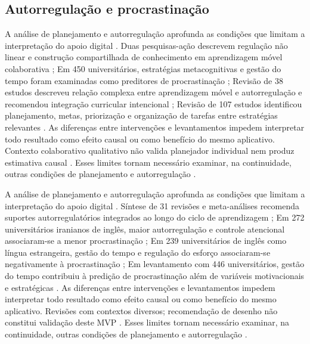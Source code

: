 \clearpage\subsection*{Autorregulação e procrastinação}

A análise de planejamento e autorregulação aprofunda as condições que limitam a interpretação do apoio digital \citep{education_lim2019} \citep{education_limone2020} \citep[p. 156, 164–165]{education_palalas2020} \citep{education_patzak2025}. Duas pesquisas-ação descrevem regulação não linear e construção compartilhada de conhecimento em aprendizagem móvel colaborativa \citep{education_lim2019}; Em 450 universitários, estratégias metacognitivas e gestão do tempo foram examinadas como preditores de procrastinação \citep{education_limone2020}; Revisão de 38 estudos descreveu relação complexa entre aprendizagem móvel e autorregulação e recomendou integração curricular intencional \citep[p. 156, 164–165]{education_palalas2020}; Revisão de 107 estudos identificou planejamento, metas, priorização e organização de tarefas entre estratégias relevantes \citep{education_patzak2025}. As diferenças entre intervenções e levantamentos impedem interpretar todo resultado como efeito causal ou como benefício do mesmo aplicativo. Contexto colaborativo qualitativo não valida planejador individual nem produz estimativa causal \citep{education_lim2019} \citep{education_limone2020} \citep[p. 156, 164–165]{education_palalas2020} \citep{education_patzak2025}. Esses limites tornam necessário examinar, na continuidade, outras condições de planejamento e autorregulação \citep{education_lim2019} \citep{education_limone2020} \citep[p. 156, 164–165]{education_palalas2020} \citep{education_patzak2025}.

A análise de planejamento e autorregulação aprofunda as condições que limitam a interpretação do apoio digital \citep[p. 1809, 1825–1827]{education_prasse2024} \citep{education_taghavi2024} \citep{education_tao2025} \citep{education_wolters2017}. Síntese de 31 revisões e meta-análises recomenda suportes autorregulatórios integrados ao longo do ciclo de aprendizagem \citep[p. 1809, 1825–1827]{education_prasse2024}; Em 272 universitários iranianos de inglês, maior autorregulação e controle atencional associaram-se a menor procrastinação \citep{education_taghavi2024}; Em 239 universitários de inglês como língua estrangeira, gestão do tempo e regulação do esforço associaram-se negativamente à procrastinação \citep{education_tao2025}; Em levantamento com 446 universitários, gestão do tempo contribuiu à predição de procrastinação além de variáveis motivacionais e estratégicas \citep{education_wolters2017}. As diferenças entre intervenções e levantamentos impedem interpretar todo resultado como efeito causal ou como benefício do mesmo aplicativo. Revisões com contextos diversos; recomendação de desenho não constitui validação deste MVP \citep[p. 1809, 1825–1827]{education_prasse2024} \citep{education_taghavi2024} \citep{education_tao2025} \citep{education_wolters2017}. Esses limites tornam necessário examinar, na continuidade, outras condições de planejamento e autorregulação \citep[p. 1809, 1825–1827]{education_prasse2024} \citep{education_taghavi2024} \citep{education_tao2025} \citep{education_wolters2017}.

